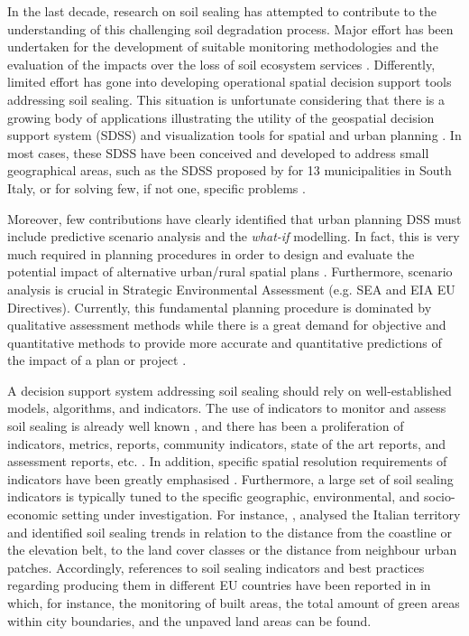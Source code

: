 \documentclass[APA,LATO1COL,doublespace]{WileyNJD-v2}
\begin{document}
In the last decade, research on soil sealing has attempted to contribute to the understanding of this challenging soil degradation process. Major effort has been undertaken for the development of suitable monitoring methodologies \citep{ISPRA18,Alvarado18} and the evaluation of the impacts over the loss of soil ecosystem services \citep{Calzolari16}. Differently, limited effort has gone into developing operational spatial decision support tools addressing soil sealing.
This situation is unfortunate considering that there is a growing body of applications illustrating the utility of the geospatial decision support system (SDSS) and visualization tools for spatial and urban planning  \citep[e.g.][]{Bishop98,Geertman12,Carsjens07,Malczewski04,Malczewski06,Meyer08}.
In most cases, these SDSS have been conceived and developed to address small geographical areas, such as the SDSS proposed by \citep{Piero17} for 13 municipalities in South Italy, or for solving few, if not one, specific problems \citep[e.g.][]{Fedra98,Meyer08,Torresan16}. %

Moreover, few contributions have clearly identified that urban planning DSS must include predictive scenario analysis \citep{Choi16,Xiang03,Volk10} and the \textit{what-if} modelling. In fact, this is very much required in planning procedures in order to design and evaluate the potential impact of alternative urban/rural spatial plans \citep{Hawkins02,Harms95,Choi16,vonHaaren06}. 
Furthermore, scenario analysis is crucial in Strategic Environmental Assessment (e.g. SEA and EIA EU Directives). Currently, this fundamental planning procedure is dominated by qualitative assessment methods while there is a great demand for objective and quantitative methods \citep{Choi16} to provide more accurate and quantitative predictions of the impact of a plan or project \citep{Carver03,Vanderhaegen05}.

A decision support system addressing soil sealing should rely on well-established models, algorithms, and indicators. The use of indicators to monitor and assess soil sealing is already well known \citep{King16}, and there has been a proliferation of indicators, metrics, reports, community indicators, state of the art reports, and assessment reports, etc. \citep{Maclaren96,Tanguay10}.
In addition, specific spatial resolution requirements of indicators have been greatly emphasised \citep{Jaeger08}.
Furthermore, a large set of soil sealing indicators is typically tuned to the specific geographic, environmental, and socio-economic setting under investigation.
For instance, \citet{Munafo13}, analysed the Italian territory and identified soil sealing trends in relation to the distance from the coastline or the elevation belt, to the land cover classes or the distance from neighbour urban patches.
Accordingly, references to soil sealing indicators and best practices regarding producing them in different EU countries have been reported in \citep{EC2011b} in which, for instance, the monitoring of built areas, the total amount of green areas within city boundaries, and the unpaved land areas can be found.
\end{document}
